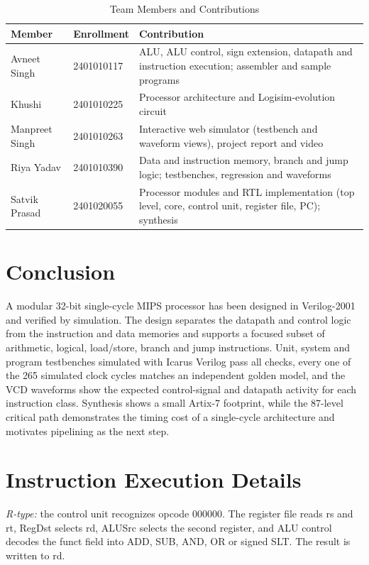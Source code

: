 \documentclass[conference]{IEEEtran}
\begin{document}
\begin{table}[t]
\caption{Team Members and Contributions}
\label{tab:team}
\centering\footnotesize\setlength{\tabcolsep}{3pt}
\begin{tabular}{@{}p{1.7cm}p{1.45cm}p{4.5cm}@{}}
\toprule
Member & Enrollment & Contribution\\
\midrule
Avneet Singh & 2401010117 & ALU, ALU control, sign extension, datapath and instruction execution; assembler and sample programs\\
Khushi & 2401010225 & Processor architecture and Logisim-evolution circuit\\
Manpreet Singh & 2401010263 & Interactive web simulator (testbench and waveform views), project report and video\\
Riya Yadav & 2401010390 & Data and instruction memory, branch and jump logic; testbenches, regression and waveforms\\
Satvik Prasad & 2401020055 & Processor modules and RTL implementation (top level, core, control unit, register file, PC); synthesis\\
\bottomrule
\end{tabular}
\end{table}

\section{Conclusion}
A modular 32-bit single-cycle MIPS processor has been designed in Verilog-2001 and verified by simulation. The design separates the datapath and control logic from the instruction and data memories and supports a focused subset of arithmetic, logical, load/store, branch and jump instructions. Unit, system and program testbenches simulated with Icarus Verilog pass all checks, every one of the 265 simulated clock cycles matches an independent golden model, and the VCD waveforms show the expected control-signal and datapath activity for each instruction class. Synthesis shows a small Artix-7 footprint, while the 87-level critical path demonstrates the timing cost of a single-cycle architecture and motivates pipelining as the next step.

\appendices
\section{Instruction Execution Details}
\emph{R-type:} the control unit recognizes opcode 000000. The register file reads rs and rt, RegDst selects rd, ALUSrc selects the second register, and ALU control decodes the funct field into ADD, SUB, AND, OR or signed SLT. The result is written to rd.
\end{document}
